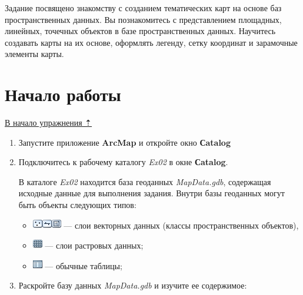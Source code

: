 \documentclass[]{book}
\providecommand{\tightlist}{%
  \setlength{\itemsep}{0pt}\setlength{\parskip}{0pt}}
\theoremstyle{definition}
\theoremstyle{definition}
\theoremstyle{definition}
\theoremstyle{remark}
\begin{document}
Задание посвящено знакомству с созданием тематических карт на основе баз
пространственных данных. Вы познакомитесь с представлением площадных,
линейных, точечных объектов в базе пространственных данных. Научитесь
создавать карты на их основе, оформлять легенду, сетку координат и
зарамочные элементы карты.

\hypertarget{map-design-general-begin}{%
\section{Начало работы}\label{map-design-general-begin}}

\protect\hyperlink{map-design-general}{В начало упражнения ⇡}

\begin{enumerate}
\def\labelenumi{\arabic{enumi}.}
\item
  Запустите приложение \textbf{ArcMap} и откройте окно \textbf{Сatalog}
\item
  Подключитесь к рабочему каталогу \emph{Ex02} в окне \textbf{Сatalog}.

  В каталоге \emph{Ex02} находится база геоданных \emph{MapData.gdb},
  содержащая исходные данные для выполнения задания. Внутри базы
  геоданных могут быть объекты следующих типов:

  \begin{itemize}
  \tightlist
  \item
    \includegraphics{images/Ex02/image5.png}\includegraphics{images/Ex02/image6.png}\includegraphics{images/Ex02/image7.png}
    --- слои векторных данных (классы пространственных объектов),
  \item
    \includegraphics{images/Ex02/image8.png} --- слои растровых данных;
  \item
    \includegraphics{images/Ex02/image9.png} --- обычные таблицы;
  \end{itemize}
\item
  Раскройте базу данных \emph{MapData.gdb} и изучите ее содержимое:


\end{enumerate}
\end{document}
